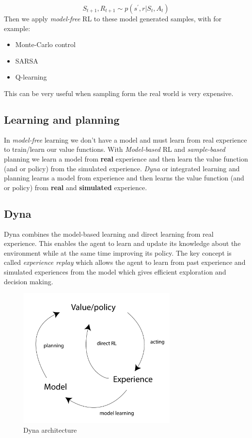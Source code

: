 	\begin{equation}
	 	S_{t+1}, R_{t+1} \sim p(s^{\prime},r|S_t,A_t)
	 \end{equation} 
Then we apply \emph{model-free} RL to these model generated samples, with for example:

	\begin{itemize}
	 	\item Monte-Carlo control
	 	\item SARSA
	 	\item Q-learning
	 \end{itemize} 

 This can be very useful when sampling form the real world is very expensive. 

\subsection*{Learning and planning}
In \emph{model-free} learning we don't have a model and must learn from real experience to train/learn our value functions. With \emph{Model-based} RL and \emph{sample-based} planning we learn a model from \textbf{real} experience and then learn the value function (and or policy) from the simulated experience. \emph{Dyna} or integrated learning and planning learns a model from experience and then learns the value function (and or policy) from \textbf{real} and \textbf{simulated} experience. 


\subsection*{Dyna}
Dyna combines the model-based learning and direct learning from real experience. This enables the agent to learn and update its knowledge about the environment while at the same time improving its policy. The key concept is called \emph{experience replay} which allows the agent to learn from past experience and simulated experiences from the model which gives efficient exploration and decision making.

\begin{figure}[ht!]
\centering
\includegraphics[width=80mm]{figures/dyna.pdf}
\caption{Dyna architecture}
\label{fig:dyna}
\end{figure}

